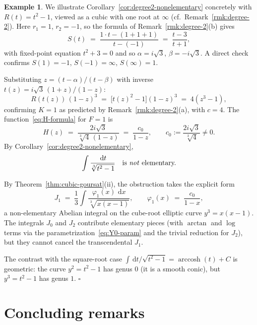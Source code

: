 \documentclass[11pt,a4paper]{article}
\theoremstyle{plain}
\theoremstyle{definition}
\newtheorem{example}[theorem]{Example}
\theoremstyle{remark}
\renewcommand{\d}{\,\mathrm{d}}
\begin{document}
\begin{example}
We illustrate Corollary~\ref{cor:degree2-nonelementary} concretely with $R(t) = t^2 - 1$, viewed as a cubic with one root at $\infty$ (cf.\ Remark~\ref{rmk:degree-2}). Here $r_1 = 1$, $r_2 = -1$, so the formula of Remark~\ref{rmk:degree-2}(b) gives
\[
  S(t) \;=\; \frac{1\cdot t - (1 + 1 + 1)}{t - (-1)} \;=\; \frac{t-3}{t+1},
\]
with fixed-point equation $t^2 + 3 = 0$ and so $\alpha = i\sqrt{3}$, $\beta = -i\sqrt{3}$. A direct check confirms $S(1) = -1$, $S(-1) = \infty$, $S(\infty) = 1$.

Substituting $z = (t-\alpha)/(t-\beta)$ with inverse $t(z) = i\sqrt{3}\,(1+z)/(1-z)$:
\[
  R(t(z))\,(1-z)^3 \;=\; \bigl[t(z)^2 - 1\bigr](1-z)^3 \;=\; 4(z^3 - 1),
\]
confirming $K = 1$ as predicted by Remark~\ref{rmk:degree-2}(a), with $c = 4$. The function~\eqref{eq:H-formula} for $F = 1$ is
\[
  H(z) \;=\; \frac{2i\sqrt{3}}{\sqrt[3]{4}\,(1-z)} \;=\; \frac{c_0}{1-z},\qquad c_0 := \frac{2i\sqrt{3}}{\sqrt[3]{4}}\neq 0.
\]
By Corollary~\ref{cor:degree2-nonelementary},
\[
  \int \frac{\d t}{\sqrt[3]{t^2-1}} \quad\text{is \emph{not} elementary.}
\]

By Theorem~\ref{thm:cubic-goursat}(ii), the obstruction takes the explicit form
\[
  J_1 \;=\; \frac{1}{3}\int \frac{\varphi_1(x)\,\d x}{\sqrt[3]{x(x-1)}},\qquad \varphi_1(x) \;=\; \frac{c_0}{1-x},
\]
a non-elementary Abelian integral on the cube-root elliptic curve $y^3 = x(x-1)$. The integrals $J_0$ and $J_2$ contribute elementary pieces (with $\arctan$ and $\log$ terms via the parametrization~\eqref{eq:Y0-param} and the trivial reduction for $J_2$), but they cannot cancel the transcendental $J_1$.

The contrast with the square-root case $\int\d t/\sqrt{t^2-1} = \operatorname{arccosh}(t) + C$ is geometric: the curve $y^2 = t^2-1$ has genus $0$ (it is a smooth conic), but $y^3 = t^2-1$ has genus $1$. \hfill$\square$
\end{example}

\section{Concluding remarks}
\label{sec:remarks}
\end{document}

